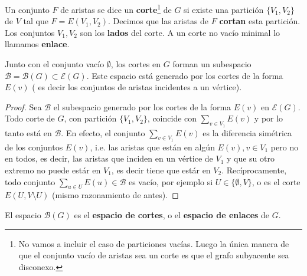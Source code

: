 \documentclass[../main.tex]{subfiles}
\begin{document}
\begin{definition}
Un conjunto $F$ de aristas se dice un \textbf{corte}\footnote{No vamos a incluir el caso de particiones vacías. Luego la única manera de que el conjunto vacío de aristas sea un corte es que el grafo subyacente sea disconexo.}
 de $G$ si existe una partición $\{V_1,V_2\}$ de $V$ tal que $F = E(V_1,V_2)$. Decimos que las aristas de $F$ \textbf{cortan} esta partición. Los conjuntos $V_1,V_2$ son los \textbf{lados} del corte. A un corte no vacío minimal lo llamamos \textbf{enlace}.
\end{definition}

\begin{proposition}
Junto con el conjunto vacío $\emptyset$, los cortes en $G$ forman un subespacio $\mathcal B = \mathcal B ( G) \subset \mathcal{E}(G)$. Este espacio está generado por los cortes de la forma $E(v)$ ( es decir los conjuntos de aristas incidentes a un vértice).
\end{proposition}
\begin{proof}
Sea $\mathcal B$ el subespacio generado por los cortes de la forma $E(v)$ en $\mathcal{E} (G)$. Todo corte de $G$, con partición $\{ V_1 , V_2 \}$, coincide con $\sum_{v \in V_1} E(v)$ y por lo tanto está en $\mathcal{B}$. En efecto, el conjunto $\sum_{v \in V_1} E(v)$ es la diferencia simétrica de los conjuntos $E(v)$, i.e. las aristas que están en algún $E(v), v  \in V_1$ pero no en todos, es decir, las aristas que inciden en un vértice de $V_1$ y que su otro extremo no puede estár en $V_1$, es decir tiene que estár en $V_2$. Recíprocamente, todo conjunto $\sum_{u \in U}E(u) \in \mathcal{B}$ es vacío, por ejemplo si $U \in \{ \emptyset , V \}$, o es el corte $E(U, V \setminus U)$ (mismo razonamiento de antes).
\end{proof}

\begin{definition}
El espacio $\mathcal{B} (G)$ es el \textbf{espacio de cortes}, o el \textbf{espacio de enlaces} de $G$.
\end{definition}
\end{document}
